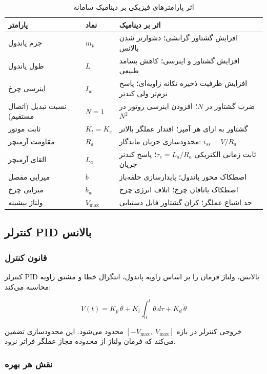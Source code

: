\begin{table}[H]
\centering
\caption{اثر پارامترهای فیزیکی بر دینامیک سامانه}
\label{tab:physical-params}
\begin{tabular}{@{}lll@{}}
\toprule
پارامتر & نماد & اثر بر دینامیک \\
\midrule
جرم پاندول & $m_p$ & افزایش گشتاور گرانشی؛ دشوارتر شدن بالانس \\
طول پاندول & $L$ & افزایش گشتاور و اینرسی؛ کاهش بسامد طبیعی \\
اینرسی چرخ & $I_w$ & افزایش ظرفیت ذخیره تکانه زاویه‌ای؛ پاسخ نرم‌تر ولی کندتر \\
نسبت تبدیل (اتصال مستقیم) & $N=1$ & ضرب گشتاور در $N$؛ افزودن اینرسی روتور در $N^2$ \\
ثابت موتور & $K_t = K_e$ & گشتاور به ازای هر آمپر؛ اقتدار عملگر بالاتر \\
مقاومت آرمیچر & $R_a$ & محدودسازی جریان ماندگار: $i_{ss} = V/R_a$ \\
القای آرمیچر & $L_a$ & ثابت زمانی الکتریکی $\tau_e = L_a/R_a$؛ پاسخ کندتر جریان \\
میرایی مفصل & $b$ & اصطکاک محور پاندول؛ پایدارسازی حلقه‌باز \\
میرایی چرخ & $b_w$ & اصطکاک یاتاقان چرخ؛ اتلاف انرژی چرخ \\
ولتاژ بیشینه & $V_{\max}$ & حد اشباع عملگر؛ کران گشتاور قابل دستیابی \\
\bottomrule
\end{tabular}
\end{table}


\subsection{کنترلر PID بالانس}

\subsubsection{قانون کنترل}

کنترلر PID بالانس، ولتاژ فرمان را بر اساس زاویه پاندول، انتگرال خطا و مشتق زاویه محاسبه می‌کند:

\begin{equation}
V(t) = K_p\,\theta + K_i\int_0^t \theta\,d\tau + K_d\,\dot{\theta}
\label{eq:pid-law}
\end{equation}

خروجی کنترلر در بازه $[-V_{\max},\; V_{\max}]$ محدود می‌شود. این محدودسازی تضمین می‌کند که فرمان ولتاژ از محدوده مجاز عملگر فراتر نرود.

\subsubsection{نقش هر بهره}

